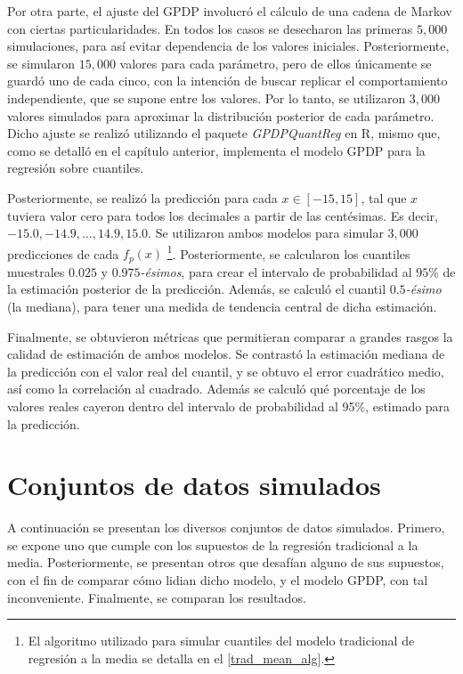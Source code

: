 Por otra parte, el ajuste del GPDP involucr\'o el c\'alculo de una cadena de Markov con ciertas particularidades. En todos los casos se desecharon las primeras $5,000$ simulaciones, para as\'i evitar dependencia de los valores iniciales. Posteriormente, se simularon $15,000$ valores para cada par\'ametro, pero de ellos \'unicamente se guard\'o uno de cada cinco, con la intenci\'on de buscar replicar el comportamiento independiente, que se supone entre los valores. Por lo tanto, se utilizaron $3,000$ valores simulados para aproximar la distribuci\'on posterior de cada par\'ametro. Dicho ajuste se realiz\'o utilizando el paquete \textit{GPDPQuantReg} en R, mismo que, como se detalló en el cap\'itulo anterior, implementa el modelo GPDP para la regresi\'on sobre cuantiles.

Posteriormente, se realiz\'o la predicci\'on para cada $x \in [-15,15]$, tal que $x$ tuviera valor cero para todos los decimales a partir de las cent\'esimas. Es decir, $-15.0,-14.9,\ldots,14.9,15.0$. Se utilizaron ambos modelos para simular $3,000$ predicciones de cada $f_p(x)$ \footnote{El algoritmo utilizado para simular cuantiles del modelo tradicional de regresi\'on a la media se detalla en el \autoref{trad_mean_alg}.}. Posteriormente, se calcularon los cuantiles  muestrales $0.025$ y $0.975$\textit{-\'esimos}, para crear el intervalo de probabilidad al $95\%$ de la estimaci\'on posterior de la predicci\'on. Adem\'as, se calcul\'o el cuantil $0.5$\textit{-\'esimo} (la mediana), para tener una medida de tendencia central de dicha estimaci\'on. 

Finalmente, se obtuvieron m\'etricas que permitieran comparar a grandes rasgos la calidad de estimaci\'on de ambos modelos. Se contrast\'o la estimaci\'on mediana de la predicci\'on con el valor real del cuantil, y se obtuvo el error cuadr\'atico medio, as\'i como la correlaci\'on al cuadrado. Adem\'as se calcul\'o qu\'e porcentaje de los valores reales cayeron dentro del intervalo de probabilidad al 95\%, estimado para la predicci\'on.

\section{Conjuntos de datos simulados}

A continuaci\'on se presentan los diversos conjuntos de datos simulados. Primero, se expone uno que cumple con los supuestos de la regresi\'on tradicional a la media. Posteriormente, se presentan otros que desaf\'ian alguno de sus supuestos, con el fin de comparar c\'omo lidian dicho modelo, y el modelo GPDP, con tal inconveniente. Finalmente, se comparan los resultados.

